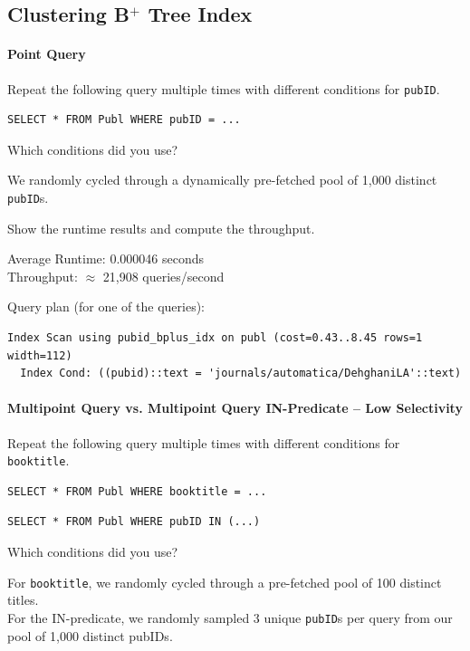 \documentclass[11pt]{scrartcl}
\begin{document}
\subsection*{Clustering B$^+$ Tree Index}

\paragraph{Point Query}

Repeat the following query multiple times with different conditions for \texttt{pubID}.

\begin{lstlisting}[style=dbtsql]
SELECT * FROM Publ WHERE pubID = ...
\end{lstlisting}

Which conditions did you use?

We randomly cycled through a dynamically pre-fetched pool of 1,000 distinct \texttt{pubID}s.

Show the runtime results and compute the throughput.

Average Runtime: 0.000046 seconds \\
Throughput: $\approx$ 21,908 queries/second

Query plan (for one of the queries):

{\small
\parskip0pt\begin{verbatim}
Index Scan using pubid_bplus_idx on publ (cost=0.43..8.45 rows=1 width=112)
  Index Cond: ((pubid)::text = 'journals/automatica/DehghaniLA'::text)
\end{verbatim}}

\paragraph{Multipoint Query vs. Multipoint Query IN-Predicate -- Low Selectivity}

Repeat the following query multiple times with different conditions for \texttt{booktitle}.

\begin{lstlisting}[style=dbtsql]
SELECT * FROM Publ WHERE booktitle = ...
\end{lstlisting}

\begin{lstlisting}[style=dbtsql]
SELECT * FROM Publ WHERE pubID IN (...)
\end{lstlisting}


Which conditions did you use?

For \texttt{booktitle}, we randomly cycled through a pre-fetched pool of 100 distinct titles. \\
For the IN-predicate, we randomly sampled 3 unique \texttt{pubID}s per query from our pool of 1,000 distinct pubIDs.
\end{document}
